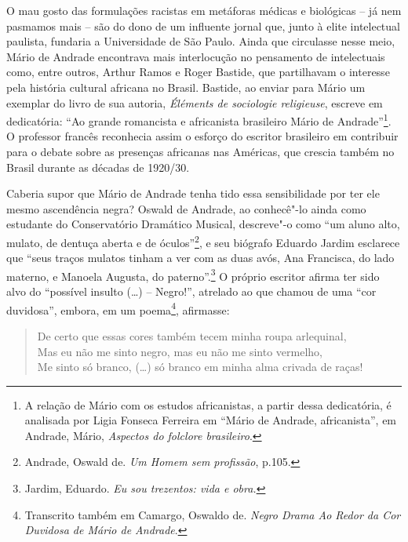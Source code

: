 O mau gosto das formulações racistas em metáforas médicas e biológicas
-- já nem pasmamos mais -- são do dono de um influente jornal que, junto
à elite intelectual paulista, fundaria a Universidade de São Paulo.
Ainda que circulasse nesse meio, Mário de Andrade encontrava mais
interlocução no pensamento de intelectuais como, entre outros, Arthur
Ramos e Roger Bastide, que partilhavam o interesse pela história
cultural africana no Brasil. Bastide, ao enviar para Mário um exemplar
do livro de sua autoria, \emph{Éléments de sociologie religieuse},
escreve em dedicatória: ``Ao grande romancista e africanista brasileiro
Mário de Andrade''\footnote{A relação de Mário com os estudos
  africanistas, a partir dessa dedicatória, é analisada por Ligia
  Fonseca Ferreira em ``Mário de Andrade, africanista'', em Andrade,
  Mário, \emph{Aspectos do folclore brasileiro}.}. O professor francês
reconhecia assim o esforço do escritor brasileiro em contribuir para o
debate sobre as presenças africanas nas Américas, que crescia também no
Brasil durante as décadas de 1920/30.

Caberia supor que Mário de Andrade tenha tido essa sensibilidade por ter
ele mesmo ascendência negra? Oswald de Andrade, ao conhecê"-lo ainda como
estudante do Conservatório Dramático Musical, descreve"-o como ``um aluno
alto, mulato, de dentuça aberta e de óculos''\footnote{Andrade, Oswald
  de. \emph{Um Homem sem profissão}, p.105.}, e seu biógrafo Eduardo
Jardim esclarece que ``seus traços mulatos tinham a ver com as duas
avós, Ana Francisca, do lado materno, e Manoela Augusta, do
paterno''.\footnote{Jardim, Eduardo. \emph{Eu sou trezentos: vida e
  obra.}} O próprio escritor afirma ter sido alvo do ``possível insulto
(\ldots{}) -- Negro!'', atrelado ao que chamou de uma ``cor duvidosa'',
embora, em um poema\footnote{Transcrito também em Camargo, Oswaldo de.
  \emph{Negro Drama Ao Redor da Cor Duvidosa de Mário de Andrade}.},
afirmasse:

\begin{verse}
De certo que essas cores também tecem minha \qb{}roupa arlequinal,\\
Mas eu não me sinto negro, mas eu não me \qb{}sinto vermelho,\\
Me sinto só branco, (\ldots{}) só branco em minha \qb{}alma crivada de raças!
\end{verse}

